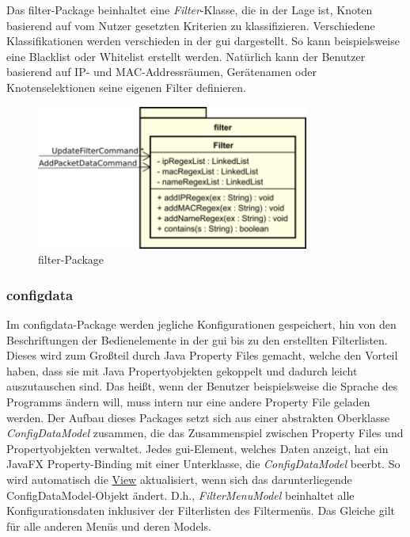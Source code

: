     Das filter-Package beinhaltet eine \textit{Filter}-Klasse, die in der Lage ist,
    Knoten basierend auf vom Nutzer gesetzten Kriterien zu klassifizieren. Verschiedene
    Klassifikationen werden verschieden in der \gls{gui} dargestellt. So kann
    beispielsweise eine Blacklist oder Whitelist erstellt werden.
    Natürlich kann der Benutzer basierend auf IP- und MAC-Addressräumen,
    Gerätenamen oder Knotenselektionen seine eigenen Filter definieren.

    \begin{figure}[H]
      \centering
      \includegraphics[width=0.8\textwidth]{../diagramimages/filter.png}
      \caption{filter-Package}
    \end{figure}

    \subsubsection{configdata}
    \label{subsubsec:configdata}

    Im configdata-Package werden jegliche Konfigurationen gespeichert, hin von den
    Beschriftungen der Bedienelemente in der \gls{gui} bis zu den erstellten Filterlisten. Dieses
    wird zum Großteil durch Java Property Files gemacht, welche den Vorteil haben, dass
    sie mit Java Propertyobjekten gekoppelt und dadurch leicht auszutauschen sind.
    Das heißt, wenn der Benutzer beispielsweise die Sprache des Programms ändern
    will, muss intern nur eine andere Property File geladen werden.
    \newline
    \newline
    Der Aufbau dieses Packages setzt sich aus einer abstrakten Oberklasse
    \textit{ConfigDataModel} zusammen, die das Zusammenspiel zwischen Property Files
    und Propertyobjekten verwaltet. Jedes \gls{gui}-Element, welches Daten anzeigt, hat
    ein JavaFX Property-Binding mit einer Unterklasse, die \textit{ConfigDataModel}
    beerbt. So wird automatisch die \hyperref[subsec:view]{View} aktualisiert,
    wenn sich das darunterliegende ConfigDataModel-Objekt ändert. D.h.,
    \textit{FilterMenuModel} beinhaltet alle Konfigurationsdaten inklusiver der
    Filterlisten des Filtermenüs. Das Gleiche gilt für alle anderen Menüs und
    deren Models.

